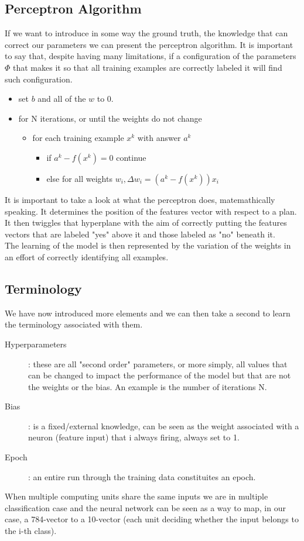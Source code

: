 \subsection*{Perceptron Algorithm}
If we want to introduce in some way the ground truth, the knowledge that can correct our parameters we can present the perceptron algorithm. It is important to say that, despite having many limitations, if a configuration of the parameters $\Phi$ that makes it so that all training examples are correctly labeled it will find such configuration.
\begin{itemize}
    \item set $b$ and all of the $w$ to 0.
    \item for N iterations, or until the weights do not change
    \begin{itemize}
        \item for each training example $x^k$ with answer $a^k$
        \begin{itemize}
            \item if $a^k-f(x^k) = 0$ continue
            \item else for all weights $w_i, \Delta w_i = (a^k-f(x^k))x_i$
        \end{itemize}
    \end{itemize}
\end{itemize}
It is important to take a look at what the perceptron does, matemathically speaking. It determines the position of the features vector with respect to a plan. It then twiggles that hyperplane with the aim of correctly putting the features vectors that are labeled "yes" above it and those labeled as "no" beneath it.\\
The learning of the model is then represented by the variation of the weights in an effort of correctly identifying all examples.
\subsection*{Terminology}
We have now introduced more elements and we can then take a second to learn the terminology associated with them.
\begin{description}
    \item[Hyperparameters]: these are all "second order" parameters, or more simply, all values that can be changed to impact the performance of the model but that are not the weights or the bias. An example is the number of iterations N.
    \item[Bias]: is a fixed/external knowledge, can be seen as the weight associated with a neuron (feature input) that i always firing, always set to 1.
    \item[Epoch]: an entire run through the training data constituites an epoch.
\end{description}
When multiple computing units share the same inputs we are in multiple classification case and the neural network can be seen as a way to map, in our case, a 784-vector to a 10-vector (each unit deciding whether the input belongs to the i-th class). 